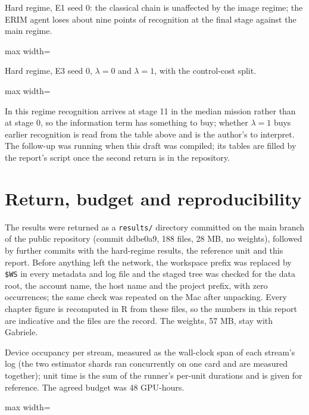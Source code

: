\documentclass[11pt,a4paper]{article}
\newcommand{\tabfit}[1]{\begin{adjustbox}{max width=\textwidth}\small #1\end{adjustbox}}
\begin{document}
\begin{table}[H]\caption{Hard regime, E1 seed 0: the classical chain is unaffected by the image regime; the ERIM agent loses about nine points of recognition at the final stage against the main regime.}
\tabfit{}\end{table}

\begin{table}[H]\caption{Hard regime, E3 seed 0, $\lambda = 0$ and $\lambda = 1$, with the control-cost split.}
\tabfit{}\end{table}

In this regime recognition arrives at stage 11 in the median mission rather than at stage 0, so the information term has something to buy; whether $\lambda = 1$ buys earlier recognition is read from the table above and is the author's to interpret.
\else
The follow-up was running when this draft was compiled; its tables are filled by the report's script once the second return is in the repository.
\fi

\section{Return, budget and reproducibility}\label{sec:return}

The results were returned as a \texttt{results/} directory committed on the main branch of the public repository (commit ddbe0a9, 188 files, 28 MB, no weights), followed by further commits with the hard-regime results, the reference unit and this report. Before anything left the network, the workspace prefix was replaced by \texttt{\$WS} in every metadata and log file and the staged tree was checked for the data root, the account name, the host name and the project prefix, with zero occurrences; the same check was repeated on the Mac after unpacking. Every chapter figure is recomputed in R from these files, so the numbers in this report are indicative and the files are the record. The weights, 57 MB, stay with Gabriele.

\begin{table}[H]\caption{Device occupancy per stream, measured as the wall-clock span of each stream's log (the two estimator shards ran concurrently on one card and are measured together); unit time is the sum of the runner's per-unit durations and is given for reference. The agreed budget was 48 GPU-hours.}
\tabfit{}\end{table}
\end{document}

